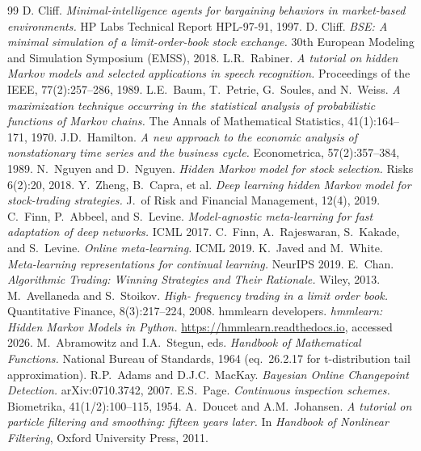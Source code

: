 \documentclass[11pt,a4paper]{article}
\begin{document}
\begin{thebibliography}{99}\small
{} D. Cliff. \textit{Minimal-intelligence agents for
bargaining behaviors in market-based environments.} HP Labs Technical
Report HPL-97-91, 1997.
 D. Cliff. \textit{BSE: A minimal simulation of a
limit-order-book stock exchange.} 30th European Modeling and Simulation
Symposium (EMSS), 2018.
 L.R.~Rabiner. \textit{A tutorial on hidden
Markov models and selected applications in speech recognition.}
Proceedings of the IEEE, 77(2):257--286, 1989.
 L.E.~Baum, T.~Petrie, G.~Soules, and
N.~Weiss. \textit{A maximization technique occurring in the statistical
analysis of probabilistic functions of Markov chains.} The Annals of
Mathematical Statistics, 41(1):164--171, 1970.
 J.D.~Hamilton. \textit{A new approach to the
economic analysis of nonstationary time series and the business cycle.}
Econometrica, 57(2):357--384, 1989.
 N.~Nguyen and D.~Nguyen. \textit{Hidden Markov
model for stock selection.} Risks 6(2):20, 2018.
 Y.~Zheng, B.~Capra, et al. \textit{Deep learning
hidden Markov model for stock-trading strategies.} J.\ of Risk and
Financial Management, 12(4), 2019.
 C.~Finn, P.~Abbeel, and S.~Levine.
\textit{Model-agnostic meta-learning for fast adaptation of deep networks.}
ICML 2017.
 C.~Finn, A.~Rajeswaran, S.~Kakade, and S.~Levine.
\textit{Online meta-learning.} ICML 2019.
 K.~Javed and M.~White. \textit{Meta-learning
representations for continual learning.} NeurIPS 2019.
 E.~Chan. \textit{Algorithmic Trading: Winning
Strategies and Their Rationale.} Wiley, 2013.
 M.~Avellaneda and S.~Stoikov. \textit{High-
frequency trading in a limit order book.} Quantitative Finance,
8(3):217--224, 2008.
 hmmlearn developers. \textit{hmmlearn: Hidden Markov
Models in Python.} \url{https://hmmlearn.readthedocs.io}, accessed 2026.
 M.~Abramowitz and I.A.~Stegun, eds.
\textit{Handbook of Mathematical Functions.} National Bureau of Standards,
1964 (eq.\ 26.2.17 for t-distribution tail approximation).
 R.P.~Adams and D.J.C.~MacKay.
\textit{Bayesian Online Changepoint Detection.}
arXiv:0710.3742, 2007.
 E.S.~Page. \textit{Continuous inspection schemes.}
Biometrika, 41(1/2):100--115, 1954.
 A.~Doucet and A.M.~Johansen.
\textit{A tutorial on particle filtering and smoothing: fifteen years later.}
In \textit{Handbook of Nonlinear Filtering}, Oxford University Press, 2011.
\end{thebibliography}
\end{document}

